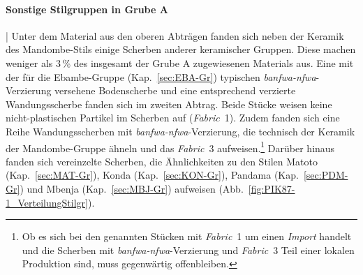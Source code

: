 \paragraph{Sonstige Stilgruppen in Grube A}\hspace{-.5em}|\hspace{.5em}%
Unter dem Material aus den oberen Abträgen fanden sich neben der Keramik des Mandombe-Stils einige Scherben anderer keramischer Gruppen. Diese machen weniger als 3\,\% des insgesamt der Grube A zugewiesenen Materials aus. Eine mit der für die Ebambe-Gruppe (Kap.~\ref{sec:EBA-Gr}) typischen \textit{banfwa-nfwa}-Verzierung versehene Bodenscherbe und eine entsprechend verzierte Wandungsscherbe fanden sich im zweiten Abtrag. Beide Stücke weisen keine nicht-plastischen Partikel im Scherben auf (\textit{Fabric}~1). Zudem fanden sich eine Reihe Wandungsscherben mit \textit{banfwa-nfwa}-Verzierung, die technisch der Keramik der Mandombe-Gruppe ähneln und das \textit{Fabric}~3 aufweisen.\footnote{Ob es sich bei den genannten Stücken mit \textit{Fabric}~1 um einen \textit{Import} handelt und die Scherben mit \textit{banfwa-nfwa}-Verzierung und \textit{Fabric}~3 Teil einer lokalen Produktion sind, muss gegenwärtig offenbleiben.} Darüber hinaus fanden sich vereinzelte Scherben, die Ähnlichkeiten zu den Stilen Matoto (Kap.~\ref{sec:MAT-Gr}), Konda (Kap.~\ref{sec:KON-Gr}), Pandama (Kap.~\ref{sec:PDM-Gr}) und Mbenja (Kap.~\ref{sec:MBJ-Gr}) aufweisen (Abb.~\ref{fig:PIK87-1_VerteilungStilgr}). 

